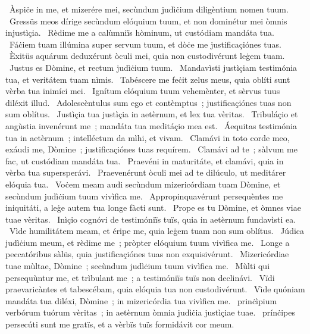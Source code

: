 \psalmBody
{%
~Àspiċe in me, et mizerére mei, secùndum judìċium diligèntium nomen tuum.
~Gressüs meos dírige secùndum elóquium tuum, et non dominétur mei òmnis injustìçia.
~Rèdime me a calùmniïs hòminum, ut custódiam mandáta tua.
~Fáċiem tuam illúmina super servum tuum, et dòċe me justificaçiónes tuas.
~Èxitüs aquárum deduxérunt òculi mei, quia non custodivérunt leġem tuam.
~Justus es Dòmine, et rectum judìċium tuum.
~Mandavìsti justìçiam testimónia tua, et veritátem tuam nìmis.
~Tabéscere me feċit zelus meus, quia oblíti sunt vèrba tua inimíci mei.
~Ignítum elóquium tuum vehemènter, et sèrvus tuus diléxit illud.
~Adolescèntulus sum ego et contèmptus~; justificaçiónes tuas non sum oblítus.
~Justìçia tua justìçia in aetèrnum, et lex tua vèritas.
~Tribuláçio et angùstia invenérunt me~; mandáta tua meditáçio mea est.
~Áequitas testimónia tua in aetèrnum~; intelléctum da mìhi, et vivam.
~Clamávi in toto corde meo, exáudi me, Dòmine~; justificaçiónes tuas requírem.
~Clamávi ad te~; sàlvum me fac, ut custódiam mandáta tua.
~Praevéni in maturitáte, et clamávi, quia in vèrba tua supersperávi.
~Praevenérunt òculi mei ad te dilúculo, ut meditárer elóquia tua.
~Voċem meam audi secùndum mizericórdiam tuam Dòmine, et secùndum judìċium tuum vivìfica me.
~Appropinquavérunt persequèntes me iniquitáti, a leġe autem tua longe fàcti sunt.
~Prope es tu Dòmine, et òmnes viae tuae vèritas.
~Inìçio cognóvi de testimóniïs tuïs, quia in aetèrnum fundavìsti ea.
~Vìde humilitátem meam, et éripe me, quia leġem tuam non sum oblítus.
~Júdica judìċium meum, et rèdime me~; pròpter elóquium tuum vivìfica me.
~Longe a peccatóribus sàlüs, quia justificaçiónes tuas non exquisivérunt.
~Mizericórdiae tuae mùltae, Dòmine~; secùndum judìċium tuum vivìfica me.
~Mùlti qui persequùntur me, et trìbulant me~; a testimóniïs tuïs non declinávi.
~Vïdi praevaricàntes et tabescébam, quia elóquia tua non custodivérunt.
~Vìde quóniam mandáta tua diléxi, Dòmine~; in mizericórdia tua vivìfica me.
~prinċìpium verbórum tuórum vèritas~; in aetèrnum òmnia judìċia justìçiae tuae.
~prínċipes persecúti sunt me gratïs, et a vèrbïs tuïs formidávit cor meum.
}

